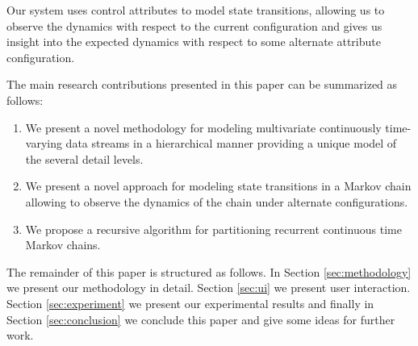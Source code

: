 Our system uses control attributes to model state transitions, allowing us to observe
the dynamics with respect to the current configuration and gives us insight into the
expected dynamics with respect to some alternate attribute configuration.

The main research contributions presented in this paper can be summarized as follows:
\begin{enumerate}{}
  \item We present a novel methodology for modeling multivariate continuously time-varying data streams
  in a hierarchical manner providing a unique model of the several detail levels.
  \item We present a novel approach for modeling state transitions in a Markov chain allowing
  to observe the dynamics of the chain under alternate configurations.
  \item We propose a recursive algorithm for partitioning recurrent continuous time Markov chains.
\end{enumerate}


The remainder of this paper is structured as follows. In Section \ref{sec:methodology} we present
our methodology in detail. Section \ref{sec:ui} we present user interaction. Section \ref{sec:experiment}
we present our experimental results and finally in Section \ref{sec:conclusion} we conclude this
paper and give some ideas for further work.

